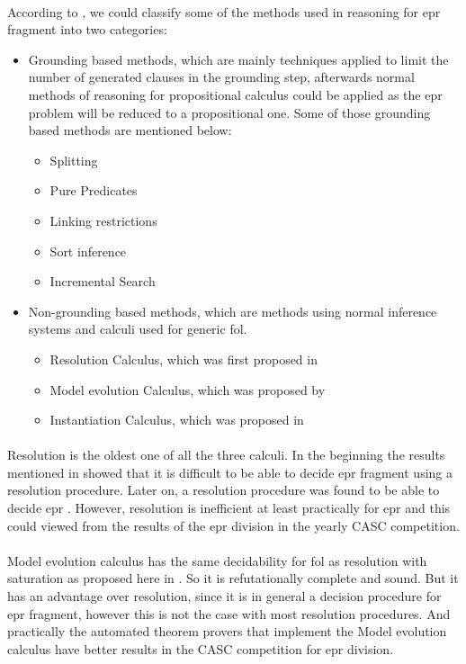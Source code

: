 \paragraph{}
According to \cite{EPR_PHD}, we could classify some of the methods used in reasoning for \ac{epr} fragment into two categories:
	\begin{itemize}
		\item Grounding based methods, which are mainly techniques applied to limit the number of generated clauses in the grounding step, afterwards normal methods of reasoning for propositional calculus could be applied as the \ac{epr} problem will be reduced to a propositional one. Some of those grounding based methods are mentioned below: 
			\begin{itemize}
				\item Splitting
				\item Pure Predicates
				\item Linking restrictions
				\item Sort inference
				\item Incremental Search			
			\end{itemize}
		\item Non-grounding based methods, which are methods using normal inference systems and calculi used for generic \ac{fol}.
			\begin{itemize}
				\item Resolution Calculus, which was first proposed in \cite{RES_65}
				\item Model evolution Calculus, which was proposed by \cite{MOD03}  
				\item Instantiation Calculus, which was proposed in \cite{INST03}
			\end{itemize} 
	\end{itemize}		

\paragraph{}
Resolution is the oldest one of all the three calculi. In the beginning the results mentioned in \cite{RES76} showed that it is difficult to be able to decide \ac{epr} fragment using a resolution procedure. Later on, a resolution procedure was found to be able to decide \ac{epr} \cite{RES93}. However, resolution is inefficient at least practically for \ac{epr} and this could viewed from the results of the \ac{epr} division in the yearly CASC competition.   	   

\paragraph{}
Model evolution calculus has the same decidability for \ac{fol} as resolution with saturation as proposed here in \cite{BAGA01}. So it is refutationally complete and sound. But it has an advantage over resolution, since it is in general a decision procedure for \ac{epr} fragment, however this is not the case with most resolution procedures. And practically the automated theorem provers that implement the Model evolution calculus have better results in the CASC competition for \ac{epr} division.

